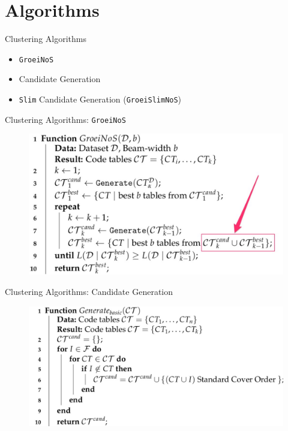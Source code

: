 \documentclass{beamer}
\newcommand{\groeinos}{\texttt{GroeiNoS}}
\begin{document}
\section{Algorithms}

\begin{frame}{Clustering Algorithms}
	\begin{itemize}
		\item \texttt{GroeiNoS}
		\item Candidate Generation
		\item \texttt{Slim} Candidate Generation (\texttt{GroeiSlimNoS})
	\end{itemize}
\end{frame}

\begin{frame}{Clustering Algorithms: \groeinos}
\begin{figure}[H]
  \centering
   \includegraphics[width=\textwidth]{img/groeinos}
\end{figure}
\end{frame}

\begin{frame}{Clustering Algorithms: Candidate Generation}
\begin{figure}[H]
  \centering
   \includegraphics[width=\textwidth]{img/genbasic}
\end{figure}
\end{frame}
\end{document}
